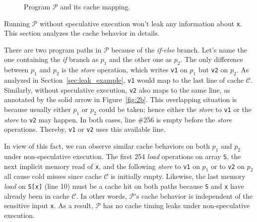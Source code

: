 \documentclass[sigconf]{acmart}
\newcommand{\prog}{\mathcal{P}}
\begin{document}
\begin{figure}
{\begin{minipage}{0.3\linewidth}
\end{minipage}
}
\vspace{-3ex}
\caption{Program $\mathcal{P}$ and its cache mapping.}
\label{fig:motiv}
\vspace{-2ex}
\end{figure}




Running $\prog$ without speculative execution won't leak any information 
about \texttt{x}. This section analyzes the cache behavior in details. 


There are two program paths in $\prog$ because of the \textit{if-else} 
branch. Let's name the one containing the \textit{if} branch as $p_1$ 
and the other one as $p_2$. The only difference between $p_1$ and $p_2$
is the \emph{store} operation, which writes \texttt{v1} on $p_1$ but 
\texttt{v2} on $p_2$. As analyzed in Section~\ref{sec:leak_example}, 
\texttt{v1} would map to the last line of cache $\mathcal{C}$. Similarly, 
without speculative execution, \texttt{v2} also maps to the same line, as 
annotated by the solid arrow in Figure~\ref{fig:2b}. This overlapping 
situation is because usually either $p_1$ or $p_2$ could be taken; 
hence either the \textit{store} to \texttt{v1} or the \textit{store} 
to \texttt{v2} may happen. In both cases, line \#256 is empty before 
the \textit{store} operations. Thereby, \texttt{v1} or \texttt{v2} 
uses this available line.


In view of this fact, we can observe similar cache behaviors on both $p_1$ 
and $p_2$ under non-speculative execution. The first 254 \emph{load} 
operations on array \texttt{S}, the next implicit memory read of \texttt{x},
and the following \textit{store} to \texttt{v1} on $p_1$ or to \texttt{v2} 
on $p_2$ all cause cold misses since cache $\mathcal{C}$ is initially empty. 
Likewise, the last memory \emph{load} on \texttt{S[x]} (line 10) must be a 
cache hit on both paths because \texttt{S} and \texttt{x} have already been 
in cache $\mathcal{C}$. In other words, $\prog$'s cache behavior is 
independent of the sensitive input \texttt{x}. As a result, $\prog$ has no 
cache timing leaks under non-speculative execution.
\end{document}
